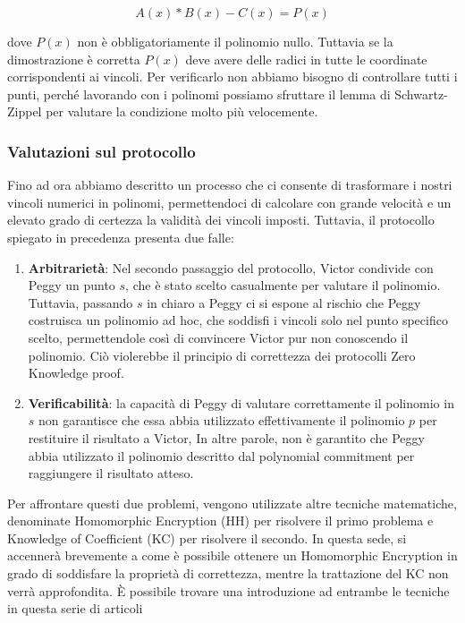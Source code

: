 \begin{enumerate}
    $$
    A(x)*B(x)-C(x)=P(x)
    $$
    
    dove $P(x)$ non è obbligatoriamente il polinomio nullo. Tuttavia se la dimostrazione è corretta $P(x)$ deve avere delle
    radici in tutte le coordinate corrispondenti ai vincoli. Per verificarlo non abbiamo bisogno di controllare tutti i
    punti, perché lavorando con i polinomi possiamo sfruttare il lemma di Schwartz-Zippel per valutare la condizione
    molto più velocemente.
\end{enumerate}
    
\subsubsection{Valutazioni sul protocollo}
Fino ad ora abbiamo descritto un processo che ci consente di trasformare i nostri vincoli numerici in polinomi,
permettendoci di calcolare con grande velocità e un elevato grado di certezza la validità dei vincoli imposti. Tuttavia,
il protocollo spiegato in precedenza presenta due falle:

\begin{enumerate}
    \item \textbf{Arbitrarietà}: Nel secondo passaggio del protocollo, Victor condivide con Peggy un punto $s$, che è stato scelto
    casualmente per valutare il polinomio. Tuttavia, passando $s$ in chiaro a Peggy ci si espone al rischio che Peggy
    costruisca un polinomio ad hoc, che soddisfi i vincoli solo nel punto specifico scelto, permettendole così di convincere
    Victor pur non conoscendo il polinomio. Ciò violerebbe il principio di correttezza dei protocolli Zero Knowledge proof.
    \item \textbf{Verificabilità}: la capacità di Peggy di valutare correttamente il polinomio in $s$ non garantisce che essa abbia
    utilizzato effettivamente il polinomio $p$ per restituire il risultato a Victor, In altre parole, non è garantito che Peggy
    abbia utilizzato il polinomio descritto dal polynomial commitment per raggiungere il risultato atteso.
\end{enumerate}

Per affrontare questi due problemi, vengono utilizzate altre tecniche matematiche, denominate Homomorphic Encryption (HH) per
risolvere il primo problema e Knowledge of Coefficient (KC) per risolvere il secondo. In questa sede, si accennerà
brevemente a come è possibile ottenere un Homomorphic Encryption in grado di soddisfare la proprietà di correttezza,
mentre la trattazione del KC non verrà approfondita. È possibile trovare una introduzione ad entrambe le tecniche
in questa serie di articoli \cite{explaining_sanrks}


